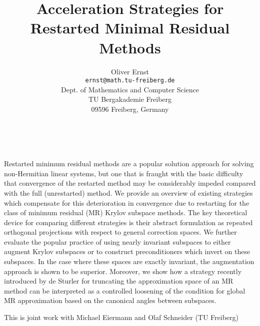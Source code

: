 \documentclass[11pt]{article}
\date{ ~ \hspace{-4mm}}
\title{Acceleration Strategies for Restarted Minimal Residual Methods  }
\author{Oliver Ernst \\ {\tt ernst@math.tu-freiberg.de} \\ Dept. of Mathematics and Computer Science  \\  TU Bergakademie Freiberg  \\  09596 Freiberg, Germany}
\begin{document}
\maketitle
\thispagestyle{empty}





 



Restarted minimum residual methods are a popular solution approach for 
solving non-Hermitian linear systems, but one that is fraught with the 
basic difficulty that convergence of the restarted method may be considerably 
impeded compared with the full (unrestarted) method.
We provide an overview of existing strategies which compensate for this
deterioration in convergence due to restarting for the class of minimum 
residual (MR) Krylov subspace methods.
The key theoretical device for comparing different strategies is their 
abstract formulation as repeated orthogonal projections with respect to 
general correction spaces.
We further evaluate the popular practice of using nearly
invariant subspaces to either augment Krylov subspaces or to construct
preconditioners which invert on these subspaces.
In the case where these spaces are exactly invariant, the augmentation
approach is shown to be superior.
Moreover, we show how a strategy recently introduced by de Sturler for 
truncating the approximation space of an MR method  can
be interpreted as a controlled loosening of the condition for global 
MR approximation based on the canonical angles between subspaces.



This is joint work with Michael Eiermann and Olaf Schneider (TU Freiberg)
\end{document}
